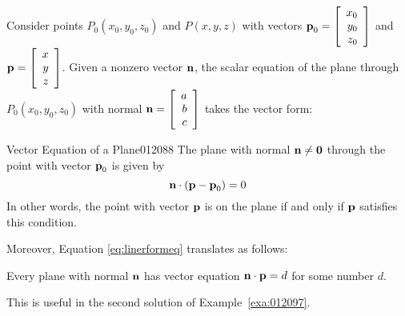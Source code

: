\noindent Consider points $P_{0}(x_{0}, y_{0}, z_{0})$ and $P(x, y, z)$ with vectors $\textbf{p}_{0} = \left[
\begin{array}{r}
x_{0}\\
y_{0}\\
z_{0}
\end{array}
\right]$
and 
$\textbf{p}= \left[
\begin{array}{r}
x\\
y\\
z
\end{array}
\right]$.
Given a nonzero vector $\textbf{n}$, the scalar equation of the plane through $P_{0}(x_{0}, y_{0}, z_{0})$ with normal $\textbf{n} = \left[
\begin{array}{r}
a\\
b\\
c
\end{array}
\right]$ takes the vector form:


\begin{theorem*}{Vector Equation of a Plane}{012088}
The plane with normal $\textbf{n} \neq \textbf{0}$ through the point with vector $\textbf{p}_{0}$ is given by
\begin{equation*}
\textbf{n} \cdot (\textbf{p} - \textbf{p}_{0}) = 0
\end{equation*}
In other words, the point with vector $\textbf{p}$ is on the plane if and only if $\textbf{p}$ satisfies this condition.
\end{theorem*}

\noindent Moreover, Equation \ref{eq:linerformeq} translates as follows:
\begin{center}
Every plane with normal $\textbf{n}$ has vector equation $\textbf{n} \cdot \textbf{p} = d$ for some number $d$.
\end{center}
\noindent This is useful in the second solution of Example~\ref{exa:012097}.


